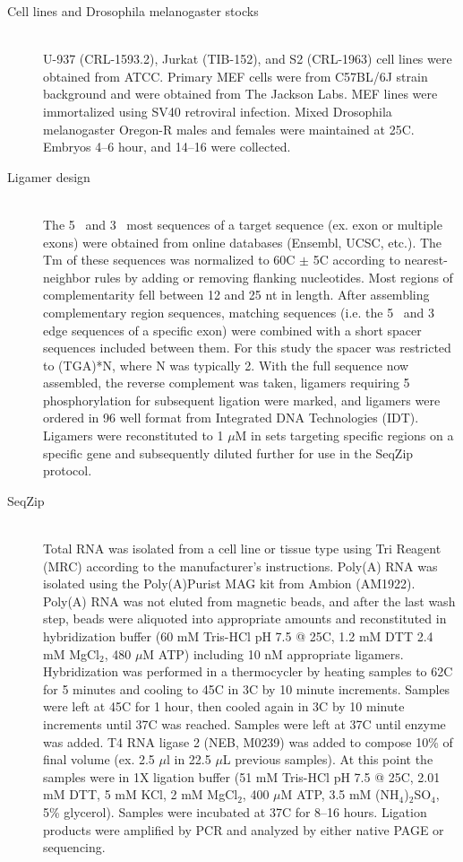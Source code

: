   \begin{description}
  	\item[Cell lines and Drosophila melanogaster stocks] \hfill \\
		
		U-937 (CRL-1593.2), Jurkat (TIB-152), and S2 (CRL-1963) cell lines were obtained from ATCC. Primary MEF cells were from C57BL/6J strain background and were obtained from The Jackson Labs. MEF lines were immortalized using SV40 retroviral infection. Mixed Drosophila melanogaster Oregon-R males and females were maintained at 25\degree C. Embryos 4–6 hour, and 14–16 were collected. 

		\item[Ligamer design] \hfill \\
		The 5\textprime~ and 3\textprime~ most sequences of a target sequence (ex. exon or multiple exons) were obtained from online databases (Ensembl, UCSC, etc.). The Tm of these sequences was normalized to 60\degree C $\pm$ 5\degree C according to nearest-neighbor rules \citep{Xia1998} by adding or removing flanking nucleotides. Most regions of complementarity fell between 12 and 25 nt in length. After assembling complementary region sequences, matching sequences (i.e. the 5\textprime~ and 3\textprime~ edge sequences of a specific exon) were combined with a short spacer sequences included between them. For this study the spacer was restricted to (TGA)*N, where N was typically 2. With the full sequence now assembled, the reverse complement was taken, ligamers requiring 5\textprime~ phosphorylation for subsequent ligation were marked, and ligamers were ordered in 96 well format from Integrated DNA Technologies (IDT). Ligamers were reconstituted to 1 $\mu$M in sets targeting specific regions on a specific gene and subsequently diluted further for use in the SeqZip protocol.

		\item[SeqZip] \hfill \\
		Total RNA was isolated from a cell line or tissue type using Tri Reagent (MRC) according to the manufacturer’s instructions. Poly(A) RNA was isolated using the Poly(A)Purist MAG kit from Ambion (AM1922). Poly(A) RNA was not eluted from magnetic beads, and after the last wash step, beads were aliquoted into appropriate amounts and reconstituted in hybridization buffer (60 mM Tris-HCl pH 7.5 @ 25\degree C, 1.2 mM DTT 2.4 mM MgCl$_{2}$, 480 $\mu$M ATP) including 10 nM appropriate ligamers. Hybridization was performed in a thermocycler by heating samples to 62\degree C for 5 minutes and cooling to 45\degree C in 3\degree C by 10 minute increments. Samples were left at 45\degree C for 1 hour, then cooled again in 3\degree C by 10 minute increments until 37C was reached. Samples were left at 37\degree C until enzyme was added. T4 RNA ligase 2 (NEB, M0239) was added to compose 10\% of final volume (ex. 2.5 $\mu$l in 22.5 $\mu$L previous samples). At this point the samples were in 1X ligation buffer (51 mM Tris-HCl pH 7.5 @ 25\degree C, 2.01 mM DTT, 5 mM KCl, 2 mM MgCl$_{2}$, 400 $\mu$M ATP, 3.5 mM (NH$_{4}$)$_{2}$SO$_{4}$, 5\% glycerol). Samples were incubated at 37\degree C for 8–16 hours. Ligation products were amplified by PCR and analyzed by either native PAGE or sequencing.


\end{description}
